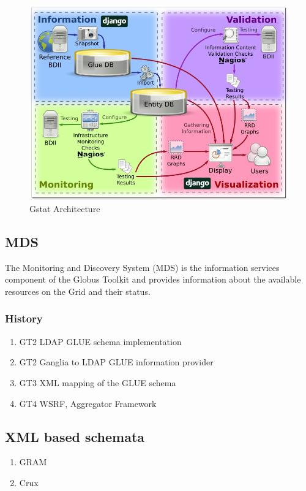 \begin{figure}[htb]
\centering
\includegraphics[width=150mm]{images/gstat-architecture.jpg}
\caption{Gstat Architecture}
\label{figure:gstat-arch}
\end{figure}

\subsection{MDS}
The Monitoring and Discovery System (MDS) is the information services component
of the Globus Toolkit and provides information about the available resources on
the Grid and their status.
\subsubsection{History}
\begin{enumerate}
  \item{GT2} LDAP GLUE schema implementation
  \item{GT2} Ganglia to LDAP GLUE information provider
  \item{GT3} XML mapping of the GLUE schema
  \item{GT4} WSRF, Aggregator Framework
\end{enumerate}

\subsection{XML based schemata}
\begin{enumerate}
  \item{GRAM}
  \item{Crux}
\end{enumerate}

